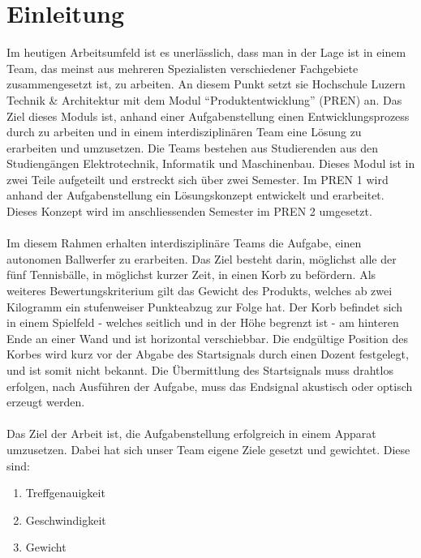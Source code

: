 \section{Einleitung}
Im heutigen Arbeitsumfeld ist es unerlässlich, dass man in der Lage ist in einem Team, das meinst aus mehreren Spezialisten verschiedener Fachgebiete zusammengesetzt ist, zu arbeiten. An diesem Punkt setzt sie Hochschule Luzern Technik \& Architektur mit dem Modul \enquote{Produktentwicklung} (PREN) an. Das Ziel dieses Moduls ist, anhand einer Aufgabenstellung einen Entwicklungsprozess durch zu arbeiten und in einem interdisziplinären Team eine Lösung zu erarbeiten und umzusetzen. Die Teams bestehen aus Studierenden aus den Studiengängen Elektrotechnik, Informatik und Maschinenbau. Dieses Modul ist in zwei Teile aufgeteilt und erstreckt sich über zwei Semester. Im PREN 1 wird anhand der Aufgabenstellung ein Lösungskonzept entwickelt und erarbeitet. Dieses Konzept wird im anschliessenden Semester im PREN 2 umgesetzt.\\
\\
Im diesem Rahmen erhalten interdisziplinäre Teams die Aufgabe, einen autonomen Ballwerfer zu erarbeiten. Das Ziel besteht darin, möglichst alle der fünf Tennisbälle, in möglichst kurzer Zeit, in einen Korb zu befördern. Als weiteres Bewertungskriterium gilt das Gewicht des Produkts, welches ab zwei Kilogramm ein stufenweiser Punkteabzug zur Folge hat. Der Korb befindet sich in einem Spielfeld - welches seitlich und in der Höhe begrenzt ist - am hinteren Ende an einer Wand und ist horizontal verschiebbar. Die endgültige Position des Korbes wird kurz vor der Abgabe des Startsignals durch einen Dozent festgelegt, und ist somit nicht bekannt. Die Übermittlung des Startsignals muss drahtlos erfolgen, nach Ausführen der Aufgabe, muss das Endsignal akustisch oder optisch erzeugt werden.\\
\\
Das Ziel der Arbeit ist, die Aufgabenstellung erfolgreich in einem Apparat umzusetzen. Dabei hat sich unser Team eigene Ziele gesetzt und gewichtet. Diese sind:
\begin{enumerate}
    \item Treffgenauigkeit
    \item Geschwindigkeit
    \item Gewicht
\end{enumerate}
